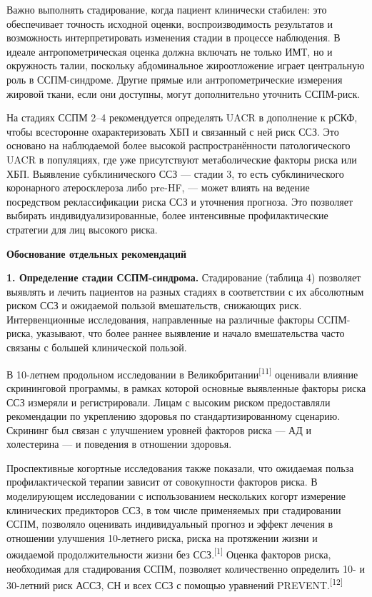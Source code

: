 \documentclass[11pt,a4paper]{article}
\newcommand{\src}[1]{\textsuperscript{[#1]}}
\newcommand{\heading}[1]{\par\medskip\textbf{#1}\par}
\begin{document}
Важно выполнять стадирование, когда пациент клинически стабилен: это обеспечивает точность исходной оценки, воспроизводимость результатов и возможность интерпретировать изменения стадии в процессе наблюдения. В идеале антропометрическая оценка должна включать не только ИМТ, но и окружность талии, поскольку абдоминальное жироотложение играет центральную роль в ССПМ-синдроме. Другие прямые или антропометрические измерения жировой ткани, если они доступны, могут дополнительно уточнить ССПМ-риск.

На стадиях ССПМ 2--4 рекомендуется определять UACR в дополнение к рСКФ, чтобы всесторонне охарактеризовать ХБП и связанный с ней риск ССЗ. Это основано на наблюдаемой более высокой распространённости патологического UACR в популяциях, где уже присутствуют метаболические факторы риска или ХБП. Выявление субклинического ССЗ --- стадии 3, то есть субклинического коронарного атеросклероза либо pre-HF, --- может влиять на ведение посредством реклассификации риска ССЗ и уточнения прогноза. Это позволяет выбирать индивидуализированные, более интенсивные профилактические стратегии для лиц высокого риска.

\heading{Обоснование отдельных рекомендаций}
\textbf{1. Определение стадии ССПМ-синдрома.} Стадирование (таблица 4) позволяет выявлять и лечить пациентов на разных стадиях в соответствии с их абсолютным риском ССЗ и ожидаемой пользой вмешательств, снижающих риск. Интервенционные исследования, направленные на различные факторы ССПМ-риска, указывают, что более раннее выявление и начало вмешательства часто связаны с большей клинической пользой.

В 10-летнем продольном исследовании в Великобритании\src{11} оценивали влияние скрининговой программы, в рамках которой основные выявленные факторы риска ССЗ измеряли и регистрировали. Лицам с высоким риском предоставляли рекомендации по укреплению здоровья по стандартизированному сценарию. Скрининг был связан с улучшением уровней факторов риска --- АД и холестерина --- и поведения в отношении здоровья.

Проспективные когортные исследования также показали, что ожидаемая польза профилактической терапии зависит от совокупности факторов риска. В моделирующем исследовании с использованием нескольких когорт измерение клинических предикторов ССЗ, в том числе применяемых при стадировании ССПМ, позволяло оценивать индивидуальный прогноз и эффект лечения в отношении улучшения 10-летнего риска, риска на протяжении жизни и ожидаемой продолжительности жизни без ССЗ.\src{1} Оценка факторов риска, необходимая для стадирования ССПМ, позволяет количественно определить 10- и 30-летний риск АССЗ, СН и всех ССЗ с помощью уравнений PREVENT.\src{12}
\end{document}
